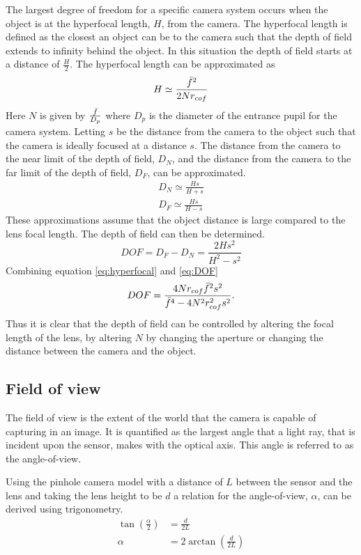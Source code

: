 The largest degree of freedom for a specific camera system occurs when the object is at the hyperfocal length, $H$, from the camera. The hyperfocal length is defined as the closest an object can be to the camera such that the depth of field extends to infinity behind the object. In this situation the depth of field starts at a distance of $\frac{H}{2}$. The hyperfocal length can be approximated as
\begin{equation}
	H \simeq \frac{\bar{f}^2}{2 N r_{cof}}
	\label{eq:hyperfocal}
\end{equation}
Here $N$ is given by $\frac{\bar{f}}{D_p}$ where $D_p$ is the diameter of the entrance pupil for the camera system. Letting $s$ be the distance from the camera to the object such that the camera is ideally focused at a distance $s$. The distance from the camera to the near limit of the depth of field, $D_N$, and the distance from the camera to the far limit of the depth of field, $D_F$, can be approximated.
\begin{align}
	D_N \simeq \frac{Hs}{H+s} \\
	D_F \simeq \frac{Hs}{H-s}
\end{align}
These approximations assume that the object distance is large compared to the lens focal length. The depth of field can then be determined.
\begin{equation}
	DOF = D_F - D_N = \frac{2 H s^2}{H^2 - s^2}
	\label{eq:DOF}
\end{equation}
Combining equation \ref{eq:hyperfocal} and \ref{eq:DOF} 
\begin{equation}
	DOF = \frac{4 N r_{cof} \bar{f}^2 s^2}{\bar{f}^4 - 4 N^2 r_{cof}^2 s^2}.
\end{equation}
Thus it is clear that the depth of field can be controlled by altering the focal length of the lens, by altering $N$ by changing the aperture or changing the distance between the camera and the object.

\subsection{Field of view}
The field of view is the extent of the world that the camera is capable of capturing in an image. It is quantified as the largest angle that a light ray, that is incident upon the sensor, makes with the optical axis. This angle is referred to as the angle-of-view.

Using the pinhole camera model with a distance of $L$ between the sensor and the lens and taking the lens height to be $d$ a relation for the angle-of-view, $\alpha$, can be derived using trigonometry.
\begin{align}
	\tan \left( \frac{\alpha}{2} \right) &= \frac{d}{2 L} \\
	\alpha &= 2 \arctan \left( \frac{d}{2L} \right)
\end{align}

